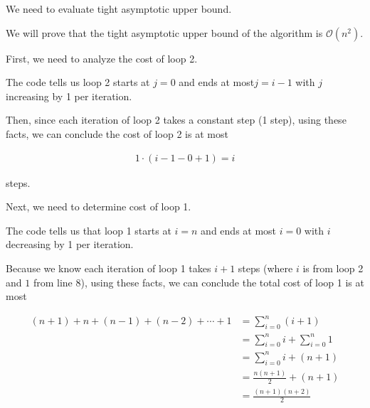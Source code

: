\documentclass[12pt]{article}
\begin{document}
\begin{enumerate}[a.]
\begin{mdframed}
        \bigskip

        We need to evaluate tight asymptotic upper bound.

        \bigskip

        We will prove that the tight asymptotic upper bound of the algorithm is
        $\mathcal{O}(n^2)$.

        \bigskip

        \color{red}First, we need to analyze the cost of loop 2.\color{black}

        \bigskip

        The code tells us loop 2 starts at $j = 0$ and ends at most$j = i - 1$ with
        $j$ increasing by 1 per iteration.

        \bigskip

        \color{red}
        Then, since each iteration of loop 2 takes a constant step (1 step), using these facts,
        we can conclude the cost of loop 2 is at most

        \setcounter{equation}{0}
        \begin{align}
            1 \cdot (i-1-0+ 1) = i
        \end{align}

        steps.
        \color{black}

        \bigskip

        \color{red}Next, we need to determine cost of loop 1.\color{black}

        \bigskip

        The code tells us that loop 1 starts at $i = n$ and ends at most $i = 0$ with
        $i$ decreasing by 1 per iteration.

        \bigskip

        Because we know each iteration of loop 1 takes \color{red} $i+1$ steps (where $i$
        is from loop 2 and $1$ from line 8)\color{black}, using these facts, we can
        conclude the total cost of \color{red}loop 1 is at most

        \begin{align}
            (n+1) + n + (n-1) + (n-2) + \cdots + 1 &= \sum\limits_{i=0}^n (i + 1)\\
            &= \sum\limits_{i=0}^n i + \sum\limits_{i=0}^n 1\\
            &= \sum\limits_{i=0}^n i + (n+1)\\
            &= \frac{n(n+1)}{2} + (n+1)\\
            &= \frac{(n+1)(n+2)}{2}
        \end{align}


\end{mdframed}
\end{enumerate}
\end{document}
